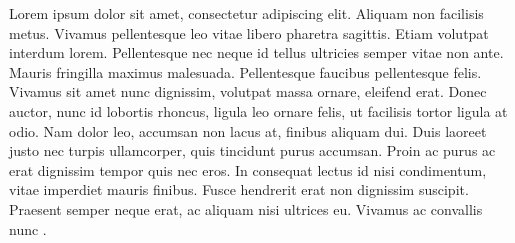 Lorem ipsum dolor sit amet, consectetur adipiscing elit. Aliquam non facilisis metus. Vivamus pellentesque leo vitae libero pharetra sagittis. Etiam volutpat interdum lorem. Pellentesque nec neque id tellus ultricies semper vitae non ante. Mauris fringilla maximus malesuada. Pellentesque faucibus pellentesque felis. Vivamus sit amet nunc dignissim, volutpat massa ornare, eleifend erat. Donec auctor, nunc id lobortis rhoncus, ligula leo ornare felis, ut facilisis tortor ligula at odio. Nam dolor leo, accumsan non lacus at, finibus aliquam dui. Duis laoreet justo nec turpis ullamcorper, quis tincidunt purus accumsan. Proin ac purus ac erat dignissim tempor quis nec eros. In consequat lectus id nisi condimentum, vitae imperdiet mauris finibus. Fusce hendrerit erat non dignissim suscipit. Praesent semper neque erat, ac aliquam nisi ultrices eu. Vivamus ac convallis nunc \cite{b1} \cite{b2} \cite{b3}.
